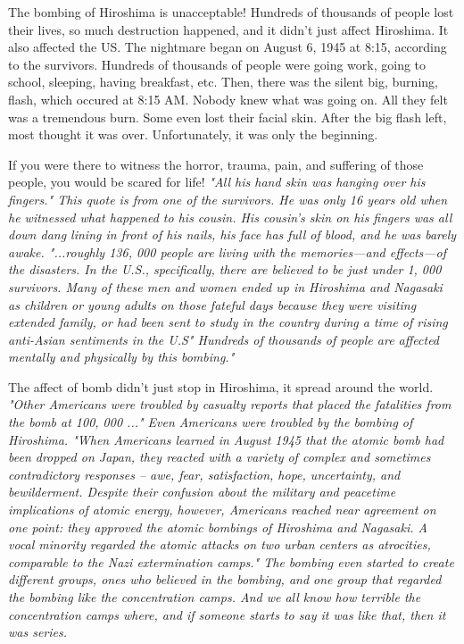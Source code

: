 The bombing of Hiroshima is unacceptable! Hundreds of thousands of people lost
their lives, so much destruction happened, and it didn’t just affect Hiroshima.
It also affected the US. The nightmare began on August 6, 1945 at 8:15,
according to the survivors. Hundreds of thousands of people were going work,
going to school, sleeping, having breakfast, etc. Then, there was the silent
big, burning, flash, which occured at 8:15 AM. Nobody knew what was going on.
All they felt was a tremendous burn. Some even lost their facial skin. After the
big flash left, most thought it was over. Unfortunately, it was only the
beginning.

If you were there to witness the horror, trauma, pain, and suffering of those
people, you would be scared for life! \it{"All his hand skin was hanging over
his fingers."} This quote is from one of the survivors. He was only 16 years old
when he witnessed what happened to his cousin. His cousin’s skin on his fingers
was all down dang lining in front of his nails, his face has full of blood, and
he was barely awake. \it{"...roughly 136, 000 people are living with the
memories—and effects—of the disasters. In the U.S., specifically, there are
believed to be just under 1, 000 survivors. Many of these men and women ended up
in Hiroshima and Nagasaki as children or young adults on those fateful days
because they were visiting extended family, or had been sent to study in the
country during a time of rising anti-Asian sentiments in the U.S" Hundreds of
thousands of people are affected mentally and physically by this bombing."}

The affect of bomb didn’t just stop in Hiroshima, it spread around
the world. \it{"Other Americans were troubled by casualty reports that placed the
fatalities from the bomb at 100, 000 ..."} Even Americans were troubled by the
bombing of Hiroshima. \it{"When Americans learned in August 1945 that the atomic
bomb had been dropped on Japan, they reacted with a variety of complex and
sometimes contradictory responses – awe, fear, satisfaction, hope, uncertainty,
and bewilderment. Despite their confusion about the military and peacetime
implications of atomic energy, however, Americans reached near agreement on
one point: they approved the atomic bombings of Hiroshima and Nagasaki. A
vocal minority regarded the atomic attacks on two urban centers as atrocities,
comparable to the Nazi extermination camps."} The bombing even started to
create different groups, ones who believed in the bombing, and one group that
regarded the bombing like the concentration camps. And we all know how
terrible the concentration camps where, and if someone starts to say it was like
that, then it was series.

